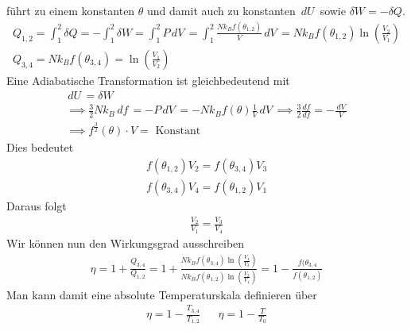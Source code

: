 \documentclass[11pt]{article}
\theoremstyle{plain}
\theoremstyle{mytheoremstyle}
\newcommand{\dd}[2]{\frac{d{#1}}{d{#2}}}
\renewcommand{\d}[1]{\,d#1\,}
\begin{document}
\begin{description}
    f\"uhrt zu einem konstanten $\theta$ und damit auch zu konstanten
    $ \d{U} $ sowie $\delta W = -\delta Q$.
    \begin{align*}
      Q_{1,2} = \int_{1}^{2} \delta Q =  - \int_{1}^{2} \delta W = 
      \int_{1}^{2} P \d{V} = \int_{1}^{2} \frac{N k_B f (\theta_{1,2})}{V}
      \d{ V} = N k_B f(\theta_{1,2}) \ln{\left( \frac{V_2}{V_1} \right)} \\
      Q_{3,4} = N k_B f(\theta_{3,4}) = \ln{\left( \frac{V_1}{V_2} \right)}
    \end{align*}
    Eine Adiabatische Transformation ist gleichbedeutend mit
    \begin{align*}
      \d{U} = \delta W \\
      \implies \frac{3}{2 } N k_B \d{f} = - P \d{V} = - N k_B f(\theta) 
      \frac{1}{V} \d{V}
      \implies \frac{3}{2} \dd{f}{f} = - \frac{\d{V}}{V} \\
      \implies f^{\frac{3}{2}}(\theta) \cdot V = \text{ Konstant }
    \end{align*}
    Dies bedeutet
    \begin{align*}
      f(\theta_{1,2}) V_2 = f(\theta_{3,4}) V_3 \\
      f(\theta_{3,4}) V_4 = f(\theta_{1,2}) V_1 
    \end{align*}
    Daraus folgt
    \begin{align*}
      \frac{V_2}{V_1} = \frac{V_3}{V_4}
    \end{align*}
    Wir k\"onnen nun den Wirkungsgrad ausschreiben
    \begin{align*}
      \eta = 1 + \frac{Q_{3,4}}{Q_{1,2}} = 1 + \frac{N k_B f(\theta_{3,4}) \ln{\left( \frac{V_4}{V_3} \right)}}{
      N k_B f(\theta_{1,2}) \ln{\left( \frac{V_2}{V_1} \right)}} = 1 -
      \frac{f(\theta_{3,4}}{f(\theta_{1,2})}
    \end{align*}
    Man kann damit eine absolute Temperaturskala definieren \"uber
    \begin{align*}
      \eta = 1 - \frac{T_{3,4}}{T_{1,2}} && \eta = 1 - \frac{T}{T_0}
    \end{align*}
    
\end{description}
\end{document}

